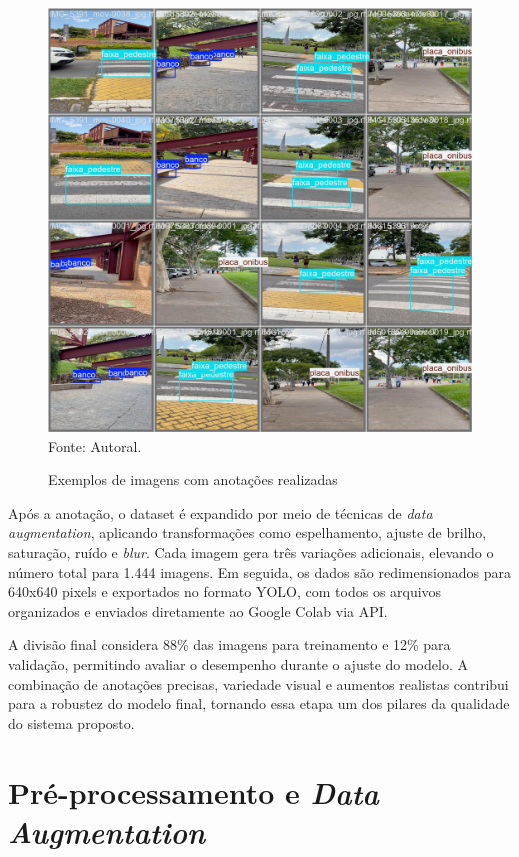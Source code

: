 \begin{figure}[htbp]
  \centering
  \caption{Exemplos de imagens com anotações realizadas}
  \includegraphics[width=1 \textwidth]{Figuras/val_batch2_labels.jpg}
  \\
  Fonte: Autoral.
  \label{fg-ex_anot3}
\end{figure}

Após a anotação, o dataset é expandido por meio de técnicas de \textit{data augmentation}, aplicando transformações como espelhamento, ajuste de brilho, saturação, ruído e \textit{blur}. Cada imagem gera três variações adicionais, elevando o número total para 1.444 imagens. Em seguida, os dados são redimensionados para 640x640 pixels e exportados no formato YOLO, com todos os arquivos organizados e enviados diretamente ao Google Colab via API.

A divisão final considera 88\% das imagens para treinamento e 12\% para validação, permitindo avaliar o desempenho durante o ajuste do modelo. A combinação de anotações precisas, variedade visual e aumentos realistas contribui para a robustez do modelo final, tornando essa etapa um dos pilares da qualidade do sistema proposto.

\section{Pré-processamento e \textit{Data Augmentation}}

